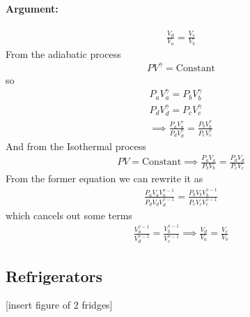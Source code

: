 \documentclass[../main.tex]{subfiles}
\begin{document}
\paragraph{Argument:} 
\begin{align*}
    \frac{V_d}{V_a} = \frac{V_c}{V_b}
\end{align*}
From the adiabatic process
\begin{align*}
    PV^\gamma = \text{Constant}
\end{align*}
so
\begin{gather*}
    P_a V_a^\gamma = P_b V_b^\gamma \\
    P_d V_d^\gamma = P_c V_c^\gamma \\
    \implies \frac{P_a V_a^\gamma}{P_d V_d^\gamma} = \frac{P_b V_b^\gamma}{P_c V_c^\gamma}
\end{gather*}
And from the Isothermal process
\begin{align*}
    PV = \text{Constant} \implies \frac{P_a V_a}{P_b V_b} = \frac{P_d V_d}{P_c V_c}
\end{align*}
From the former equation we can rewrite it as
\begin{align*}
    \frac{P_a V_a V_a^{\gamma - 1}}{P_d V_d V_d^{\gamma - 1}} = \frac{P_b V_b V_b^{\gamma - 1}}{P_c V_c V_c^{\gamma-1}}
\end{align*}
which cancels out some terms
\begin{align*}
    \frac{V_a^{\gamma - 1}}{V_d^{\gamma -1}} = \frac{V_b^{\gamma -1}}{V_c^{\gamma -1}} \implies \frac{V_d}{V_a} = \frac{V_c}{V_b}
\end{align*}

\subsection{Refrigerators}

[insert figure of 2 fridges] 
\end{document}
